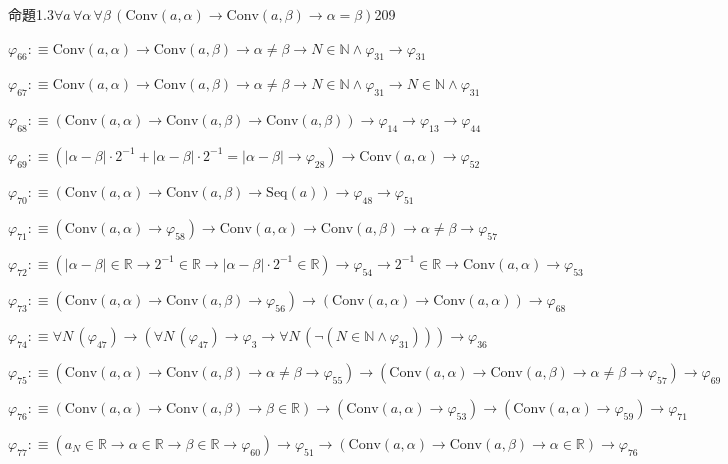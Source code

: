 \begin{fullproof}{命題1.3}{$\forall a\,\forall \alpha\,\forall \beta\,(\mathrm{Conv}(a,\alpha) \to \mathrm{Conv}(a,\beta) \to \alpha = \beta)$}{209}
\begin{abbrevlist}
\item $\varphi_{66} :\equiv \mathrm{Conv}(a,\alpha) \to \mathrm{Conv}(a,\beta) \to \alpha \neq \beta \to N \in \mathbb{N} \land \varphi_{31} \to \varphi_{31}$
\item $\varphi_{67} :\equiv \mathrm{Conv}(a,\alpha) \to \mathrm{Conv}(a,\beta) \to \alpha \neq \beta \to N \in \mathbb{N} \land \varphi_{31} \to N \in \mathbb{N} \land \varphi_{31}$
\item $\varphi_{68} :\equiv (\mathrm{Conv}(a,\alpha) \to \mathrm{Conv}(a,\beta) \to \mathrm{Conv}(a,\beta)) \to \varphi_{14} \to \varphi_{13} \to \varphi_{44}$
\item $\varphi_{69} :\equiv (\lvert \alpha - \beta \rvert \cdot 2^{-1} + \lvert \alpha - \beta \rvert \cdot 2^{-1} = \lvert \alpha - \beta \rvert \to \varphi_{28}) \to \mathrm{Conv}(a,\alpha) \to \varphi_{52}$
\item $\varphi_{70} :\equiv (\mathrm{Conv}(a,\alpha) \to \mathrm{Conv}(a,\beta) \to \mathrm{Seq}(a)) \to \varphi_{48} \to \varphi_{51}$
\item $\varphi_{71} :\equiv (\mathrm{Conv}(a,\alpha) \to \varphi_{58}) \to \mathrm{Conv}(a,\alpha) \to \mathrm{Conv}(a,\beta) \to \alpha \neq \beta \to \varphi_{57}$
\item $\varphi_{72} :\equiv (\lvert \alpha - \beta \rvert \in \mathbb{R} \to 2^{-1} \in \mathbb{R} \to \lvert \alpha - \beta \rvert \cdot 2^{-1} \in \mathbb{R}) \to \varphi_{54} \to 2^{-1} \in \mathbb{R} \to \mathrm{Conv}(a,\alpha) \to \varphi_{53}$
\item $\varphi_{73} :\equiv (\mathrm{Conv}(a,\alpha) \to \mathrm{Conv}(a,\beta) \to \varphi_{56}) \to (\mathrm{Conv}(a,\alpha) \to \mathrm{Conv}(a,\alpha)) \to \varphi_{68}$
\item $\varphi_{74} :\equiv \forall N\,(\varphi_{47}) \to (\forall N\,(\varphi_{47}) \to \varphi_{3} \to \forall N\,(\neg (N \in \mathbb{N} \land \varphi_{31}))) \to \varphi_{36}$
\item $\varphi_{75} :\equiv (\mathrm{Conv}(a,\alpha) \to \mathrm{Conv}(a,\beta) \to \alpha \neq \beta \to \varphi_{55}) \to (\mathrm{Conv}(a,\alpha) \to \mathrm{Conv}(a,\beta) \to \alpha \neq \beta \to \varphi_{57}) \to \varphi_{69}$
\item $\varphi_{76} :\equiv (\mathrm{Conv}(a,\alpha) \to \mathrm{Conv}(a,\beta) \to \beta \in \mathbb{R}) \to (\mathrm{Conv}(a,\alpha) \to \varphi_{53}) \to (\mathrm{Conv}(a,\alpha) \to \varphi_{59}) \to \varphi_{71}$
\item $\varphi_{77} :\equiv (a_{N} \in \mathbb{R} \to \alpha \in \mathbb{R} \to \beta \in \mathbb{R} \to \varphi_{60}) \to \varphi_{51} \to (\mathrm{Conv}(a,\alpha) \to \mathrm{Conv}(a,\beta) \to \alpha \in \mathbb{R}) \to \varphi_{76}$
\end{abbrevlist}
\end{fullproof}
